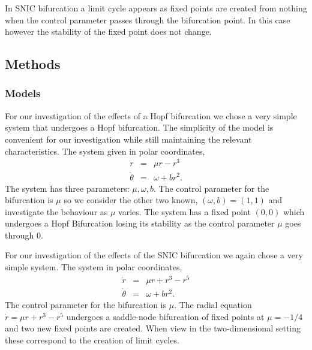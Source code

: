 \documentclass[12pt,a4paper,titlepage]{article}
\begin{document}
In SNIC bifurcation a limit cycle appears as  fixed points are created from nothing when the control parameter passes through the bifurcation point. In this case however the stability of the fixed point does not change.

\subsection{Methods}
\subsubsection{Models}
For our investigation of the effects of a Hopf bifurcation we chose a very simple system that undergoes a Hopf bifurcation\cite[p.250] {strogatz2001nonlinear}. The simplicity of the model is convenient for our investigation while still maintaining the relevant characteristics. The system given in polar coordinates,
\begin{equation}
\begin{array}{lcl}
\dot r &= & \mu r -r^3 \\
\dot \theta &= & \omega + b r^2.
\end{array}
\end{equation}
The system has three parameters: $\mu, \omega, b$. The control parameter for the bifurcation is $\mu$ so we consider the other two known, $(\omega, b)=(1,1)$ and investigate the behaviour as $\mu$ varies. The system has a fixed point $(0,0)$ which undergoes a Hopf Bifurcation losing its stability as the control parameter $\mu$ goes through $0$.

For our investigation of the effects of the SNIC bifurcation we again chose a very simple system\cite[p.250] {strogatz2001nonlinear}. The system in polar coordinates,
\begin{equation}
\begin{array}{lcl}
\dot r &= & \mu r +r^3 - r^5 \\
\dot \theta &= & \omega + b r^2.
\end{array}
\end{equation}
The control parameter for the bifurcation is $\mu$. The radial equation $\dot r =  \mu r +r^3 - r^5$ undergoes a saddle-node bifurcation of fixed points at $\mu=-1/4$ and two new fixed points are created. When view in the two-dimensional setting these correspond to the creation of limit cycles.
\end{document}

